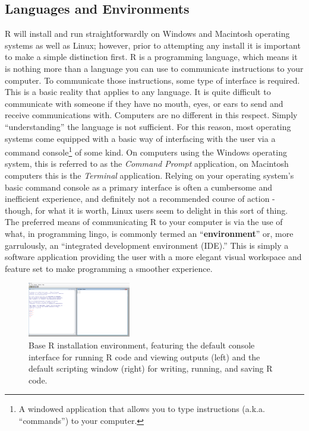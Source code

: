\subsection{Languages and Environments}
\label{sec:LangAndEnv}

R will install and run straightforwardly on Windows and Macintosh operating systems as well as Linux; however, prior to attempting any install it is important to make a simple distinction first.  R is a programming language, which means it is nothing more than a language you can use to communicate instructions to your computer. To communicate those instructions, some type of interface is required.  This is a basic reality that applies to any language.  It is quite difficult to communicate with someone if they have no mouth, eyes, or ears to send and receive communications with. Computers are no different in this respect. Simply ``understanding'' the language is not sufficient.  For this reason, most operating systems come equipped with a basic way of interfacing with the user via a \gls{command console}\footnote{A windowed application that allows you to type instructions (a.k.a. ``commands'') to your computer.} of some kind. On computers using the Windows operating system, this is referred to as the \textit{Command Prompt} application, on Macintosh computers this is the \textit{Terminal} application. Relying on your operating system's basic command console as a primary interface is often a cumbersome and inefficient experience, and definitely not a recommended course of action - though, for what it is worth, Linux users seem to delight in this sort of thing. The preferred means of communicating R to your computer is via the use of what, in programming lingo, is commonly termed an ``\textbf{environment}'' or, more garrulously, an ``\gls{integrated development environment} (\acrshort{IDE}).''  This is simply a software application providing the user with a more elegant visual workspace and feature set to make programming a smoother experience. 

\begin{figure}
  \begin{center}
    \includegraphics[width=0.4\textwidth]{graphics/ch1Figs/base_R_env.pdf}
  \end{center}
    \caption{Base R installation environment, featuring the default console interface for running R code and viewing outputs (left) and the default scripting window (right) for writing, running, and saving R code.}
    \label{fig:base_R}
\end{figure}

